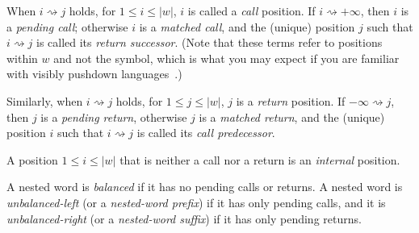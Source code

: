 When $i \rightsquigarrow j$ holds, for $1 \leq i \leq |w|$, $i$ is called a
\textsl{call} position. If $i \rightsquigarrow +\infty$, then $i$ is a
\textsl{pending call}; otherwise $i$ is a \textsl{matched call}, and the
(unique) position $j$ such that $i \rightsquigarrow j$ is called its
\textsl{return successor}. (Note that these terms refer to positions within
$w$ and not the symbol, which is what you may expect if you are familiar with
visibly pushdown languages~\cite{JACM:AM2009}.)

Similarly, when $i \rightsquigarrow j$ holds, for $1 \leq j \leq |w|$, $j$
is a \textsl{return} position. If $-\infty \rightsquigarrow j$, then $j$ is
a \textsl{pending return}, otherwise $j$ is a \textsl{matched return}, and
the (unique) position $i$ such that $i \rightsquigarrow j$ is called its
\textsl{call predecessor}.

A position $1 \leq i \leq |w|$ that is neither a call nor a return is an
\textsl{internal} position.

A nested word is \textsl{balanced} if it has no pending calls
or returns.  A nested word is \textsl{unbalanced-left} (or a
\textsl{nested-word prefix}) if it has only pending calls, and it is
\textsl{unbalanced-right} (or a \textsl{nested-word suffix})
if it has only pending returns.



